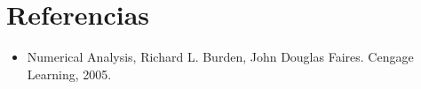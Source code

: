 \section{Referencias}

\begin{itemize}

    \item Numerical Analysis, Richard L. Burden, John Douglas Faires. Cengage Learning, 2005.

\end{itemize}
